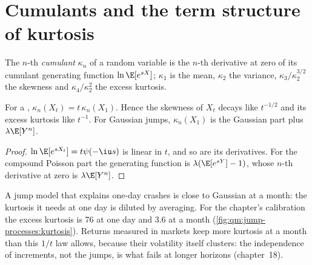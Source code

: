 \section{Cumulants and the term structure of kurtosis}

\begin{definition}[Cumulant]\label{def:qm:jump-processes:cumulant}
The $n$-th \emph{cumulant} $\kappa_n$ of a random variable is the $n$-th derivative at
zero of its cumulant generating function $\ln\E[e^{sX}]$; $\kappa_1$ is the mean, $\kappa_2$ the
variance, $\kappa_3/\kappa_2^{3/2}$ the skewness and $\kappa_4/\kappa_2^2$ the excess kurtosis.
\end{definition}

\begin{proposition}\label{prop:qm:jump-processes:scaling}
For a , $\kappa_n(X_t) = t\,\kappa_n(X_1)$. Hence the skewness of $X_t$ decays like
$t^{-1/2}$ and its excess kurtosis like $t^{-1}$. For Gaussian jumps, $\kappa_n(X_1)$ is the Gaussian
part plus $\lambda\E[Y^n]$.
\end{proposition}

\begin{proof}
$\ln\E[e^{sX_t}] = t\psi(-\iu s)$ is linear in $t$, and so are its derivatives. For the compound Poisson
part the  generating function is $\lambda(\E[e^{sY}] - 1)$, whose $n$-th derivative at zero is
$\lambda\E[Y^n]$.
\end{proof}

A jump model that explains one-day crashes is close to Gaussian at a month: the kurtosis it needs at
one day is diluted by averaging. For the chapter's calibration the excess kurtosis is 76 at one day
and 3.6 at a month (\cref{fig:qm:jump-processes:kurtosis}). Returns measured in markets keep more
kurtosis at a month than this $1/t$ law allows, because their volatility itself clusters: the
independence of increments, not the jumps, is what fails at longer horizons (chapter~18).


